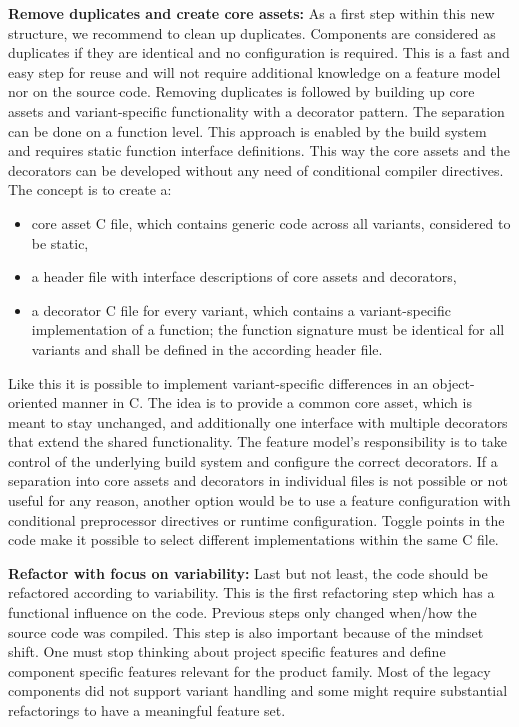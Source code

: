 \textbf{Remove duplicates and create core assets:} As a first step within this
new structure, we recommend to clean up duplicates. Components are considered as
duplicates if they are identical and no configuration is required. This is a
fast and easy step for reuse and will not require additional knowledge on a
feature model nor on the source code. Removing duplicates is followed by
building up core assets and variant-specific functionality with a decorator
pattern. The separation can be done on a function level. This approach is
enabled by the build system and requires static function interface definitions.
This way the core assets and the decorators can be developed without any need of
conditional compiler directives. The concept is to create a:
\begin{itemize}
  \item core asset C file, which contains generic code across all variants,
        considered to be static,
  \item a header file with interface descriptions of core assets and decorators,
  \item a decorator C file for every variant, which contains a variant-specific
        implementation of a function; the function signature must be identical
        for all variants and shall be defined in the according header file.
\end{itemize}
Like this it is possible to implement variant-specific differences in an
object-oriented manner in C. The idea is to provide a common core asset, which
is meant to stay unchanged, and additionally one interface with multiple
decorators that extend the shared functionality. The feature model's
responsibility is to take control of the underlying build system and configure
the correct decorators. If a separation into core assets and decorators in
individual files is not possible or not useful for any reason, another option
would be to use a feature configuration with conditional preprocessor directives
or runtime configuration. Toggle points in the code make it possible to select
different implementations within the same C file.

\textbf{Refactor with focus on variability:} Last but not least, the code should
be refactored according to variability. This is the first refactoring step which
has a functional influence on the code. Previous steps only changed when/how the
source code was compiled. This step is also important because of the mindset
shift. One must stop thinking about project specific features and define
component specific features relevant for the product family. Most of the legacy
components did not support variant handling and some might require substantial
refactorings to have a meaningful feature set.

